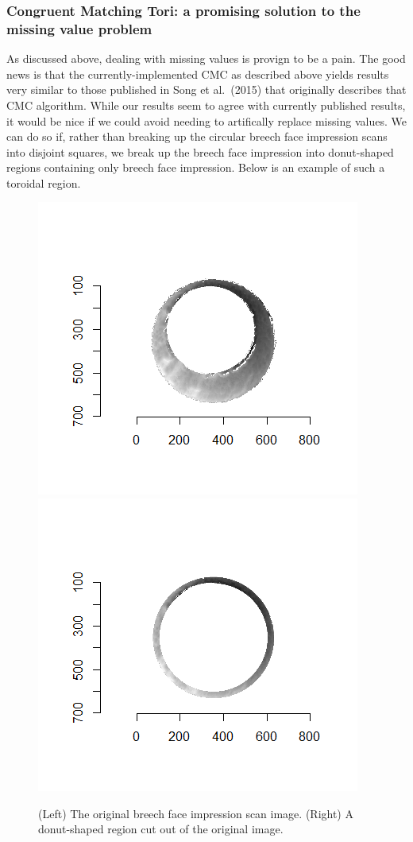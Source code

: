 \documentclass[]{book}
\begin{document}
\hypertarget{congruent-matching-tori-a-promising-solution-to-the-missing-value-problem}{%
\subsubsection{Congruent Matching Tori: a promising solution to the missing value problem}\label{congruent-matching-tori-a-promising-solution-to-the-missing-value-problem}}

As discussed above, dealing with missing values is provign to be a pain. The good news is that the currently-implemented CMC as described above yields results very similar to those published in Song et al.~(2015) that originally describes that CMC algorithm. While our results seem to agree with currently published results, it would be nice if we could avoid needing to artifically replace missing values. We can do so if, rather than breaking up the circular breech face impression scans into disjoint squares, we break up the breech face impression into donut-shaped regions containing only breech face impression. Below is an example of such a toroidal region.

\begin{figure}

{\centering \includegraphics[width=0.5\linewidth]{images/cartridge_cases/im1_original} \includegraphics[width=0.5\linewidth]{images/cartridge_cases/im1_toroidalRegion} 

}

\caption{(Left) The original breech face impression scan image. (Right) A donut-shaped region cut out of the original image.}\label{fig:unnamed-chunk-19}
\end{figure}
\end{document}
